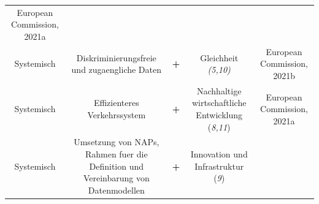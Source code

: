 \documentclass[
]{book}
\begin{document}
\begin{longtable}[]{@{}ccccc@{}}
\begin{minipage}[t]{0.17\columnwidth}
European Commission, 2021a\strut
\end{minipage}\tabularnewline
\begin{minipage}[t]{0.17\columnwidth}\centering
Systemisch\strut
\end{minipage} & \begin{minipage}[t]{0.16\columnwidth}\centering
Diskriminierungsfreie und zugaengliche Daten\strut
\end{minipage} & \begin{minipage}[t]{0.17\columnwidth}\centering
\textbf{+}\strut
\end{minipage} & \begin{minipage}[t]{0.17\columnwidth}\centering
Gleichheit \emph{(5,10)}\strut
\end{minipage} & \begin{minipage}[t]{0.17\columnwidth}\centering
European Commission, 2021b\strut
\end{minipage}\tabularnewline
\begin{minipage}[t]{0.17\columnwidth}\centering
Systemisch\strut
\end{minipage} & \begin{minipage}[t]{0.16\columnwidth}\centering
Effizienteres Verkehrssystem\strut
\end{minipage} & \begin{minipage}[t]{0.17\columnwidth}\centering
\textbf{+}\strut
\end{minipage} & \begin{minipage}[t]{0.17\columnwidth}\centering
Nachhaltige wirtschaftliche Entwicklung (\emph{8,11})\strut
\end{minipage} & \begin{minipage}[t]{0.17\columnwidth}\centering
European Commission, 2021a\strut
\end{minipage}\tabularnewline
\begin{minipage}[t]{0.17\columnwidth}\centering
Systemisch\strut
\end{minipage} & \begin{minipage}[t]{0.16\columnwidth}\centering
Umsetzung von NAPs, Rahmen fuer die Definition und Vereinbarung von Datenmodellen\strut
\end{minipage} & \begin{minipage}[t]{0.17\columnwidth}\centering
\textbf{+}\strut
\end{minipage} & \begin{minipage}[t]{0.17\columnwidth}\centering
Innovation und Infrastruktur (\emph{9})\strut
\end{minipage} & \begin{minipage}[t]{0.17\columnwidth}\centering

\end{minipage}
\end{longtable}
\end{document}
